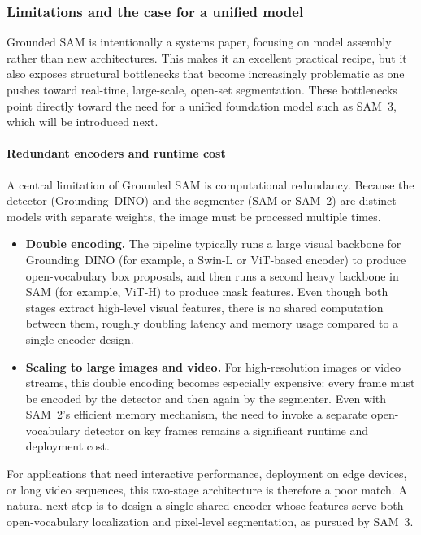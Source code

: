 \begin{enrichment}
\begin{enrichment}
		\newpage
		
		\subsubsection{Limitations and the case for a unified model}
		\label{subsubsec:chapter15_groundedsam_limitations}
		
		Grounded SAM is intentionally a systems paper, focusing on model assembly rather than new architectures.
		This makes it an excellent practical recipe, but it also exposes structural bottlenecks that become increasingly problematic as one pushes toward real-time, large-scale, open-set segmentation.
		These bottlenecks point directly toward the need for a unified foundation model such as SAM~3, which will be introduced next.
		
		\paragraph{Redundant encoders and runtime cost}
		A central limitation of Grounded SAM is computational redundancy.
		Because the detector (Grounding~DINO) and the segmenter (SAM or SAM~2) are distinct models with separate weights, the image must be processed multiple times.
		
		\begin{itemize}
			\item \textbf{Double encoding.}
			The pipeline typically runs a large visual backbone for Grounding~DINO (for example, a Swin-L or ViT-based encoder) to produce open-vocabulary box proposals, and then runs a second heavy backbone in SAM (for example, ViT-H) to produce mask features.
			Even though both stages extract high-level visual features, there is no shared computation between them, roughly doubling latency and memory usage compared to a single-encoder design.
			\item \textbf{Scaling to large images and video.}
			For high-resolution images or video streams, this double encoding becomes especially expensive: every frame must be encoded by the detector and then again by the segmenter.
			Even with SAM~2’s efficient memory mechanism, the need to invoke a separate open-vocabulary detector on key frames remains a significant runtime and deployment cost.
		\end{itemize}
		
		For applications that need interactive performance, deployment on edge devices, or long video sequences, this two-stage architecture is therefore a poor match.
		A natural next step is to design a single shared encoder whose features serve both open-vocabulary localization and pixel-level segmentation, as pursued by SAM~3.
		

\end{enrichment}
\end{enrichment}
